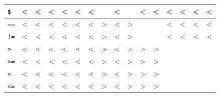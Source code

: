 \begin{tabular}{|l|c|c|c|c|c|c|c|c|c|c|c|c|c|c|c|}
\texttt{\$} & \textless{} & \textless{} & \textless{} & \textless{} & \textless{} & \textless{} & & \textless{} & & \textless{} & \textless{} & \textless{} & \textless{} & \textless{} & \textless{} \\ \hline
\rowcolor[HTML]{EEEEEE}
\texttt{==} & \textless{} & \textless{} & \textless{} & \textless{} & \textless{} & \textless{} & \textgreater{} & \textless{} & \textgreater{} & & & \textless{} & \textless{} & \textless{} & \textless{} \\ \hline
\texttt{!=} & \textless{} & \textless{} & \textless{} & \textless{} & \textless{} & \textless{} & \textgreater{} & \textless{} & \textgreater{} & & & \textless{} & \textless{} & \textless{} & \textless{} \\ \hline
\rowcolor[HTML]{EEEEEE}
\texttt{>} & \textless{} & \textless{} & \textless{} & \textless{} & \textless{} & \textless{} & \textgreater{} & \textless{} & \textgreater{} & \textgreater{} & \textgreater{} & & & & \\ \hline
\texttt{>=} & \textless{} & \textless{} & \textless{} & \textless{} & \textless{} & \textless{} & \textgreater{} & \textless{} & \textgreater{} & \textgreater{} & \textgreater{} & & & & \\ \hline
\rowcolor[HTML]{EEEEEE}
\texttt{<} & \textless{} & \textless{} & \textless{} & \textless{} & \textless{} & \textless{} & \textgreater{} & \textless{} & \textgreater{} & \textgreater{} & \textgreater{} & & & & \\ \hline
\texttt{<=} & \textless{} & \textless{} & \textless{} & \textless{} & \textless{} & \textless{} & \textgreater{} & \textless{} & \textgreater{} & \textgreater{} & \textgreater{} & & & & \\ \hline
\end{tabular}
